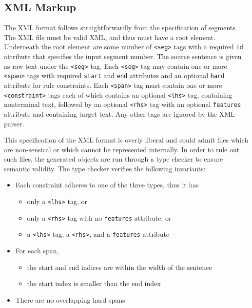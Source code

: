 \documentclass[logo]{pbml}
\begin{document}
\subsection{XML Markup}
The XML format follows straightforwardly from the specification of segments. The XML file must be valid XML, and thus must have a root element. Underneath the root element are some number of \texttt{<seg>} tags with a required \texttt{id} attribute that specifies the input segment number. The source sentence is given as raw text under the \texttt{<seg>} tag. Each \texttt{<seg>} tag may contain one or more \texttt{<span>} tags with required \texttt{start} and \texttt{end} attributes and an optional \texttt{hard} attribute for rule constraints. Each \texttt{<span>} tag must contain one or more \texttt{<constraint>} tags each of which contains an optional \texttt{<lhs>} tag, containing nonterminal text, followed by an optional \texttt{<rhs>} tag with an optional \texttt{features} attribute and containing target text. Any other tags are ignored by the XML parser.

This specification of the XML format is overly liberal and could admit files which are non-sensical or which cannot be represented internally. In order to rule out such files, the generated objects are run through a type checker to ensure semantic validity. The type checker verifies the following invariants:

\begin{itemize}
\item Each constraint adheres to one of the three types, thus it has
	\begin{itemize}
	\item only a \texttt{<lhs>} tag, or
	\item only a \texttt{<rhs>} tag with no \texttt{features} attribute, or
	\item a \texttt{<lhs>} tag, a \texttt{<rhs>}, and a \texttt{features} attribute
	\end{itemize}
\item For each span,
	\begin{itemize}
	\item the start and end indices are within the width of the sentence
	\item the start index is smaller than the end index
	\end{itemize}
\item There are no overlapping hard spans
\end{itemize}
\end{document}
